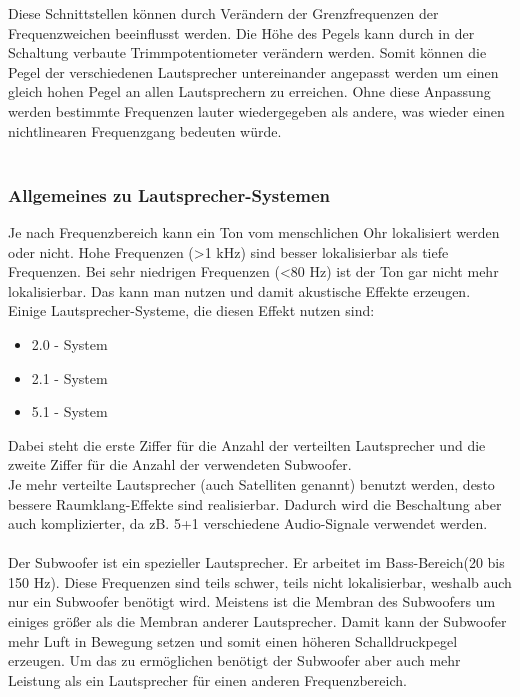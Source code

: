 
Diese Schnittstellen können durch Verändern der Grenzfrequenzen der Frequenzweichen beeinflusst werden.
Die Höhe des Pegels kann durch in der Schaltung verbaute Trimmpotentiometer verändern werden.
Somit können die Pegel der verschiedenen Lautsprecher untereinander angepasst werden um einen gleich hohen Pegel an allen Lautsprechern zu erreichen.
Ohne diese Anpassung werden bestimmte Frequenzen lauter wiedergegeben als andere, was wieder einen nichtlinearen Frequenzgang bedeuten würde.\\ \\

\subsubsection*{Allgemeines zu Lautsprecher-Systemen}
Je nach Frequenzbereich kann ein Ton vom menschlichen Ohr lokalisiert \mbox{werden} oder nicht.
Hohe Frequenzen (>1 kHz) sind besser lokalisierbar als tiefe Frequenzen.
Bei sehr niedrigen Frequenzen (<80 Hz) ist der Ton gar nicht mehr lokalisierbar. %
Das kann man nutzen und damit akustische Effekte erzeugen.
Einige Lautsprecher-Systeme, die diesen Effekt nutzen sind:
\begin{itemize}
	\item 2.0 - System
	\item 2.1 - System
	\item 5.1 - System
\end{itemize}
Dabei steht die erste Ziffer für die Anzahl der verteilten Lautsprecher und die zweite Ziffer für die Anzahl der verwendeten Subwoofer.
\\
Je mehr verteilte Lautsprecher (auch Satelliten genannt) benutzt werden, desto bessere Raumklang-Effekte sind realisierbar.
Dadurch wird die Beschaltung aber auch komplizierter, da zB. 5+1 verschiedene Audio-Signale verwendet werden.
\\ \\
Der Subwoofer ist ein spezieller Lautsprecher.
Er arbeitet im Bass-Bereich(20 bis 150 Hz).
Diese Frequenzen sind teils schwer, teils nicht lokalisierbar, weshalb auch nur ein Subwoofer benötigt wird.
Meistens ist die Membran des Subwoofers um einiges größer als die Membran anderer Lautsprecher.
Damit kann der Subwoofer mehr Luft in Bewegung setzen und somit einen höheren Schalldruckpegel erzeugen.
Um das zu ermöglichen benötigt der Subwoofer aber auch mehr Leistung als ein Lautsprecher für einen anderen Frequenzbereich.
\\ \\

